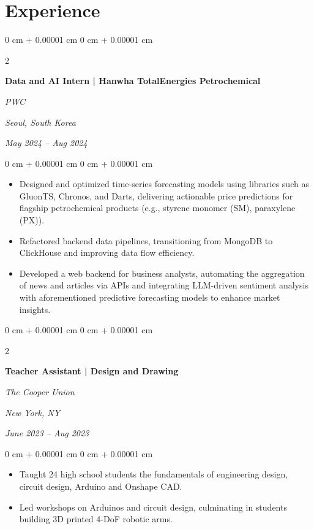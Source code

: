 \documentclass[11pt, letterpaper]{article}
\newenvironment{highlights}{
    \begin{itemize}[
        topsep=0.1 cm,
        parsep=0.1 cm,
        partopsep=0pt,
        itemsep=0pt,
        leftmargin=0 cm + 10pt
    ]
}{
    \end{itemize}
} %
\newenvironment{onecolentry}{
    \begin{adjustwidth}{
        0 cm + 0.00001 cm
    }{
        0 cm + 0.00001 cm
    }
}{
    \end{adjustwidth}
} %
\newenvironment{twocolentry}[2][]{
    \onecolentry
    \def\secondColumn{#2}
    \setcolumnwidth{\fill, 4.5 cm}
    \begin{paracol}{2}
}{
    \switchcolumn \raggedleft \secondColumn
    \end{paracol}
    \endonecolentry
} %
\begin{document}
    
    \section{Experience}



        
        \begin{twocolentry}{
        \textit{Seoul, South Korea}    
            
        \textit{May 2024 – Aug 2024}}
            \textbf{Data and AI Intern | Hanwha TotalEnergies Petrochemical}
            
            \textit{PWC}
        \end{twocolentry}

        \vspace{0.1 cm}
        \begin{onecolentry}
            \begin{highlights}
                \item Designed and optimized time-series forecasting models using libraries such as GluonTS, Chronos, and Darts, delivering actionable price predictions for flagship petrochemical products (e.g., styrene monomer (SM), paraxylene (PX)).
                \item Refactored backend data pipelines, transitioning from MongoDB to ClickHouse and improving data flow efficiency.
                \item Developed a web backend for business analysts, automating the aggregation of news and articles via APIs and integrating LLM-driven sentiment analysis with aforementioned predictive forecasting models to enhance market insights.
            \end{highlights}
        \end{onecolentry}


        \vspace{0.15 cm}

        \begin{twocolentry}{
        \textit{New York, NY}    
            
        \textit{June 2023 – Aug 2023}}
            \textbf{Teacher Assistant | Design and Drawing}
            
            \textit{The Cooper Union}
        \end{twocolentry}

        \vspace{0.1 cm}
        \begin{onecolentry}
            \begin{highlights}
                \item Taught 24 high school students the fundamentals of engineering design, circuit design, Arduino and Onshape CAD.
                \item Led workshops on Arduinos and circuit design, culminating in students building 3D printed 4-DoF robotic arms.
            \end{highlights}
        \end{onecolentry}
\end{document}
